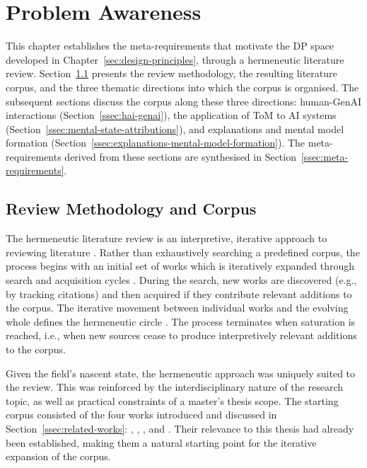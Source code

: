 \section{Problem Awareness} \label{sec:problem-awareness}

This chapter establishes the meta-requirements that motivate the \ac{DP} space developed in Chapter~\ref{sec:design-principles}, through a hermeneutic literature review. Section~\ref{ssec:review-methodology} presents the review methodology, the resulting literature corpus, and the three thematic directions into which the corpus is organised. The subsequent sections discuss the corpus along these three directions: human-\ac{GenAI} interactions (Section~\ref{ssec:hai-genai}), the application of \ac{ToM} to \ac{AI} systems (Section~\ref{ssec:mental-state-attributions}), and explanations and mental model formation (Section~\ref{ssec:explanations-mental-model-formation}). The meta-requirements derived from these sections are synthesised in Section~\ref{ssec:meta-requirements}.

\subsection{Review Methodology and Corpus} \label{ssec:review-methodology}

The hermeneutic literature review is an interpretive, iterative approach to reviewing literature \parencite{Boell2014}. Rather than exhaustively searching a predefined corpus, the process begins with an initial set of works which is iteratively expanded through search and acquisition cycles \parencite{Boell2014}. During the search, new works are discovered (e.g., by tracking citations) and then acquired if they contribute relevant additions to the corpus. The iterative movement between individual works and the evolving whole defines the hermeneutic circle \parencite{Boell2014}. The process terminates when saturation is reached, i.e., when new sources cease to produce interpretively relevant additions to the corpus.

Given the field's nascent state, the hermeneutic approach was uniquely suited to the review. This was reinforced by the interdisciplinary nature of the research topic, as well as practical constraints of a master's thesis scope. The starting corpus consisted of the four works introduced and discussed in Section~\ref{ssec:related-works}: \textcite{Weisz2025}, \textcite{Jussupow2021}, \textcite{Colombatto2025}, and \textcite{Ying2024}. Their relevance to this thesis had already been established, making them a natural starting point for the iterative expansion of the corpus.

